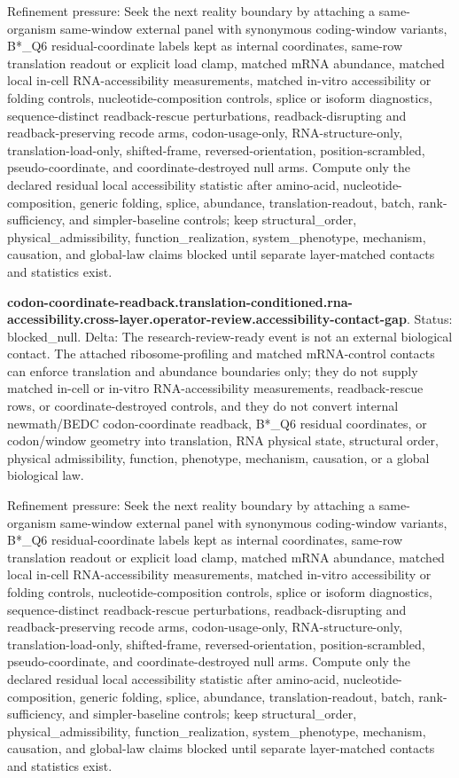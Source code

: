 Refinement pressure: Seek the next reality boundary by attaching a same-organism same-window external panel with synonymous coding-window variants, B*\_Q6 residual-coordinate labels kept as internal coordinates, same-row translation readout or explicit load clamp, matched mRNA abundance, matched local in-cell RNA-accessibility measurements, matched in-vitro accessibility or folding controls, nucleotide-composition controls, splice or isoform diagnostics, sequence-distinct readback-rescue perturbations, readback-disrupting and readback-preserving recode arms, codon-usage-only, RNA-structure-only, translation-load-only, shifted-frame, reversed-orientation, position-scrambled, pseudo-coordinate, and coordinate-destroyed null arms. Compute only the declared residual local accessibility statistic after amino-acid, nucleotide-composition, generic folding, splice, abundance, translation-readout, batch, rank-sufficiency, and simpler-baseline controls; keep structural\_order, physical\_admissibility, function\_realization, system\_phenotype, mechanism, causation, and global-law claims blocked until separate layer-matched contacts and statistics exist.

\textbf{codon-coordinate-readback.translation-conditioned.rna-accessibility.cross-layer.operator-review.accessibility-contact-gap}. Status: blocked\_null. Delta: The research-review-ready event is not an external biological contact. The attached ribosome-profiling and matched mRNA-control contacts can enforce translation and abundance boundaries only; they do not supply matched in-cell or in-vitro RNA-accessibility measurements, readback-rescue rows, or coordinate-destroyed controls, and they do not convert internal newmath/BEDC codon-coordinate readback, B*\_Q6 residual coordinates, or codon/window geometry into translation, RNA physical state, structural order, physical admissibility, function, phenotype, mechanism, causation, or a global biological law.

Refinement pressure: Seek the next reality boundary by attaching a same-organism same-window external panel with synonymous coding-window variants, B*\_Q6 residual-coordinate labels kept as internal coordinates, same-row translation readout or explicit load clamp, matched mRNA abundance, matched local in-cell RNA-accessibility measurements, matched in-vitro accessibility or folding controls, nucleotide-composition controls, splice or isoform diagnostics, sequence-distinct readback-rescue perturbations, readback-disrupting and readback-preserving recode arms, codon-usage-only, RNA-structure-only, translation-load-only, shifted-frame, reversed-orientation, position-scrambled, pseudo-coordinate, and coordinate-destroyed null arms. Compute only the declared residual local accessibility statistic after amino-acid, nucleotide-composition, generic folding, splice, abundance, translation-readout, batch, rank-sufficiency, and simpler-baseline controls; keep structural\_order, physical\_admissibility, function\_realization, system\_phenotype, mechanism, causation, and global-law claims blocked until separate layer-matched contacts and statistics exist.

